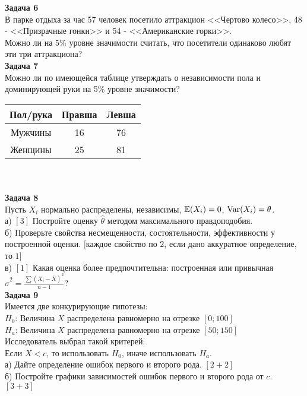 \documentclass[pdftex,12pt,a4paper]{article}
\begin{document}
\textbf{Задача 6} \\ %
В парке отдыха за час 57 человек посетило аттракцион <<Чертово
колесо>>, 48 - <<Призрачные гонки>> и 54 - <<Американские горки>>.\\
Можно ли на 5\% уровне значимости считать, что посетители
одинаково любят эти три аттракциона? \\

\textbf{Задача 7} \\ %
Можно ли по имеющейся таблице утверждать о независимости пола и
доминирующей руки на 5\% уровне значимости? \\
\begin{tabular}{|c|c|c|}
  \hline
  Пол/рука & Правша & Левша \\
  \hline
  Мужчины & 16 & 76 \\
  Женщины & 25 & 81 \\
  \hline
\end{tabular} \\ \\


\textbf{Задача 8} \\ %
Пусть $X_{i}$ нормально распределены, независимы, $\mathbb{E}(X_{i})=0$,
$\operatorname{Var}(X_{i})=\theta$. \\
а) $[3]$ Постройте оценку $\hat{\theta}$ методом максимального
правдоподобия. \\
б) Проверьте свойства несмещенности, состоятельности,
эффективности у построенной оценки. $[$каждое свойство по $2$, если дано аккуратное определение, то $1]$  \\
в) $[1]$ Какая оценка более предпочтительна: построенная или
привычная
$\hat{\sigma}^{2}=\frac{\sum(X_{i}-\bar{X})^{2}}{n-1}$? \\


\textbf{Задача 9} \\ %
Имеется две конкурирующие гипотезы: \\
$H_{0}$: Величина $X$ распределена равномерно на отрезке $[0;100]$ \\
$H_{a}$: Величина $X$ распределена равномерно на отрезке $[50;150]$ \\
Исследователь выбрал такой критерей: \\
Если $X<c$, то использовать $H_{0}$, иначе использовать $H_{a}$. \\
а) Дайте определение ошибок первого и второго рода. $[2+2]$ \\
б) Постройте графики зависимостей ошибок первого и второго рода от
$c$. $[3+3]$\\
\end{document}
